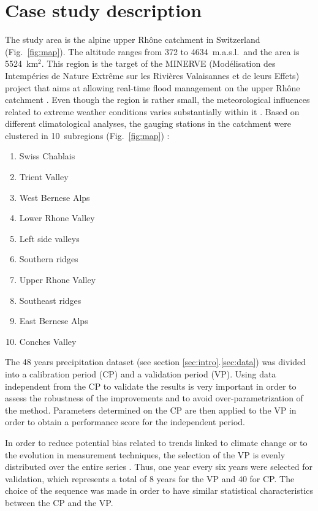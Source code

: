 \documentclass[review]{elsarticle}
\begin{document}
\section{Case study description}
\label{sec:case_study}

The study area is the alpine upper Rh\^{o}ne catchment in Switzerland (Fig.\ \ref{fig:map}). The altitude ranges from 372 to 4634~m.a.s.l.\ and the area is 5524~km$^{2}$. This region is the target of the MINERVE (Mod\'{e}lisation des Intemp\'{e}ries de Nature Extr\^{e}me sur les Rivi\`{e}res Valaisannes et de leurs Effets) project that aims at allowing real-time flood management on the upper Rh\^{o}ne catchment \citep{GarciaHernandez2009b}. Even though the region is rather small, the meteorological influences related to extreme weather conditions varies substantially within it \citep[see][]{Horton2012}. Based on different climatological analyses, the gauging stations in the catchment were clustered in 10~subregions (Fig.\ \ref{fig:map}) :

\begin{enumerate}
	\item Swiss Chablais
	\item Trient Valley
	\item West Bernese Alps
	\item Lower Rhone Valley
	\item Left side valleys
	\item Southern ridges
	\item Upper Rhone Valley
	\item Southeast ridges
	\item East Bernese Alps
	\item Conches Valley
\end{enumerate}

The 48 years precipitation dataset (see section \ref{sec:intro}.\ref{sec:data}) was divided into a calibration period (CP) and a validation period (VP). Using data independent from the CP to validate the results is very important in order to assess the robustness of the improvements and to avoid over-parametrization of the method. Parameters determined on the CP are then applied to the VP in order to obtain a performance score for the independent period.

In order to reduce potential bias related to trends linked to climate change or to the evolution in measurement techniques, the selection of the VP is evenly distributed over the entire series \citep{BenDaoud2010}. Thus, one year every six years were selected for validation, which represents a total of 8 years for the VP and 40 for CP. The choice of the sequence was made in order to have similar statistical characteristics between the CP and the VP.
\end{document}
